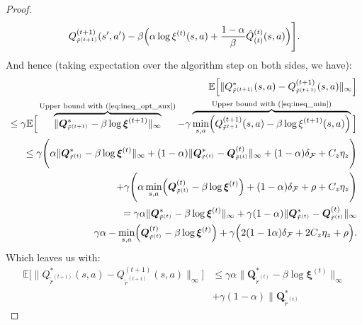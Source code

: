 \begin{proof}
\begin{align*}
            Q^{(t+1)}_{\tilde{r}^{(t+1)}}(s',a') - \beta 
            \Bigl(
                \alpha \log \xi^{(t)}(s,a) 
                + \frac{1-\alpha}{\beta}\hat{Q}^{(t)}_{(t)}(s,a)  
            \Bigr)    
        \Bigg].
    \end{align*}
    And hence (taking expectation over the algorithm step on both sides, we have):
    \begin{align*}
        \mathbb{E}\Big[ \| Q^*_{\tilde{r}^{(t+1)}}(s,a)
        -Q^{(t+1)}_{\tilde{r}^{(t+1)}}(s,a) \|_\infty \Big] \\
        \leq \gamma 
        \mathbb{E}\Big[ \overbrace{\| \bm{Q}_{\tilde{r}^{(t+1)}}^* - \beta \log \bm{\xi}^{(t+1)} \|_\infty }^\text{Upper bound with (\ref{eq:ineq_opt_aux})}
        - \gamma \overbrace{\min_{s,a} \Bigl(
            Q^{(t+1)}_{\tilde{r}^{t+1}}(s,a) - \beta \log \xi^{(t+1)}(s,a)
        \Bigr)}^\text{Upper bound with (\ref{eq:ineq_min})} \Big]\\
        \leq \gamma
        \Biggl(
            \alpha  \| \bm{Q}_{\tilde{r}^{(t)}}^* - \beta \log \bm{\xi}^{(t)} \|_\infty 
            + (1-\alpha) \|
                \bm{Q}_{\tilde{r}^{(t)}}^*  
                - {\bm{Q}}^{(t)}_{\tilde{r}^{(t)}} \|_\infty  
            + (1-\alpha) \delta_\mathcal{F} + C_z \eta_z
        \Biggr) \\
        + \gamma \Biggl(
            \alpha \min_{s,a} \Bigl(\bm{Q}^{(t)}_{\tilde{r}^{(t)}} - \beta \log \bm{\xi}^{(t)}  \Bigr) + 
            (1-\alpha) \delta_\mathcal{F} + \rho+ C_z \eta_z
        \Biggr) \\
        =
        \gamma \alpha \| \bm{Q}_{\tilde{r}^{(t)}}^* 
        - \beta \log \bm{\xi}^{(t)} \|_\infty 
        +\gamma(1-\alpha) \| \bm{Q}_{\tilde{r}^{(t)}}^*  
        - {\bm{Q}}^{(t)}_{\tilde{r}^{(t)}} \|_\infty  \\
        \gamma \alpha  -\min_{s,a} \Bigl(\bm{Q}^{(t)}_{\tilde{r}^{(t)}} - \beta \log \bm{\xi}^{(t)}  \Bigr) + 
        \gamma \Bigl(  2(1-1\alpha)\delta_\mathcal{F}+2C_z \eta_z  + \rho \Bigr).
    \end{align*}
    Which leaves us with:
    \begin{equation}
        \begin{aligned}
            \mathbb{E}\Big[\| Q^*_{\tilde{r}^{(t+1)}}(s,a)
            -Q^{(t+1)}_{\tilde{r}^{(t+1)}}(s,a) \|_\infty \Big]
            &\leq
            \gamma \alpha \| \bm{Q}_{\tilde{r}^{(t)}}^* 
            - \beta \log \bm{\xi}^{(t)} \|_\infty \\ &
            +\gamma(1-\alpha) \| \bm{Q}_{\tilde{r}^{(t)}}^*  

\end{aligned}
\end{equation}
\end{proof}
